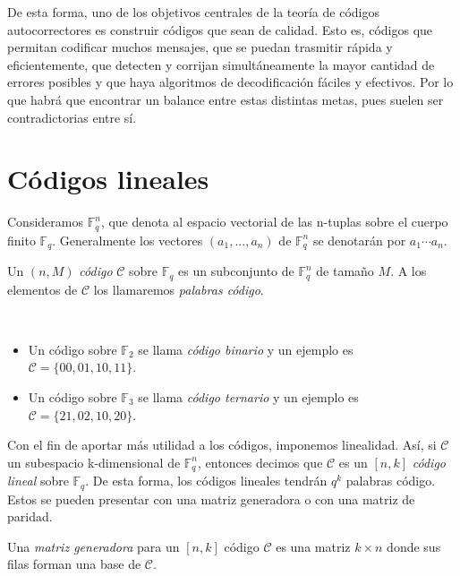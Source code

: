 De esta forma, uno de los objetivos centrales de la teoría de códigos autocorrectores es construir códigos que sean de calidad. Esto es, códigos que permitan codificar muchos mensajes, que se puedan trasmitir rápida y eficientemente, que detecten y corrijan simultáneamente la mayor cantidad de errores posibles y que haya algoritmos de decodificación fáciles y efectivos. Por lo que habrá que encontrar un balance entre estas distintas metas, pues suelen ser contradictorias entre sí.

\section{Códigos lineales}

Consideramos $\mathbb{F}_q^n$, que denota al espacio vectorial de las n-tuplas sobre el cuerpo finito $\mathbb{F}_q$. Generalmente los vectores $(a_1, ..., a_n)$ de $\mathbb{F}_q^n$ se denotarán por $a_1 \cdots a_n$.

\begin{definition}
    Un $(n, M)$ \emph{código} $\mathcal{C}$ sobre $\mathbb{F}_q$ es un subconjunto de 
    $\mathbb{F}_q^n$ de tamaño $M$. A los elementos de $\mathcal{C}$ los llamaremos \emph{palabras código}.
\end{definition}

\begin{exampleth}
    $ $
    \begin{itemize}
        \item Un código sobre $\mathbb{F}_2$ se llama \emph{código binario} y un ejemplo es $\mathcal{C} = \{00, 01, 10, 11\}$.
        \item Un código sobre $\mathbb{F}_3$ se llama \emph{código ternario} y un ejemplo es $\mathcal{C} = \{21, 02, 10, 20\}$.
    \end{itemize}
\end{exampleth}

Con el fin de aportar más utilidad a los códigos, imponemos linealidad. Así, si $\mathcal{C}$ un subespacio k-dimensional de $\mathbb{F}_q^n$, entonces decimos que $\mathcal{C}$ es un $\left[ n, k \right]$ \emph{código lineal} sobre $\mathbb{F}_q$. De esta forma, los códigos lineales tendrán $q^k$ palabras código. Estos se pueden presentar con una matriz generadora o con una matriz de paridad.

\begin{definition}
    Una \emph{matriz generadora} para un $\left[ n,k \right]$ código $\mathcal{C}$ es una matriz $k \times n$ donde sus filas forman una base de $\mathcal{C}$.
\end{definition}

